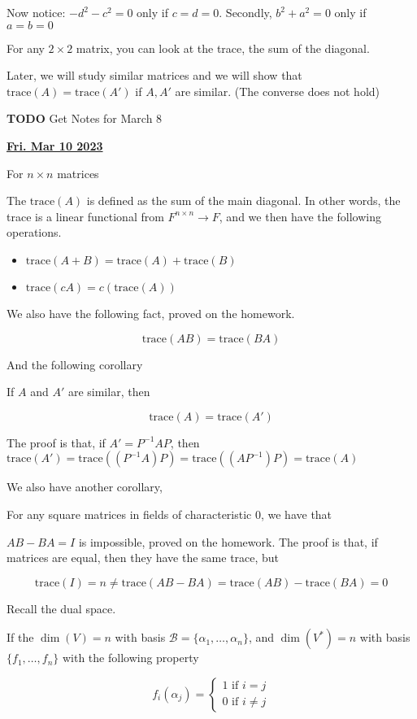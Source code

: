 \documentclass[12pt]{article}
\def\trace{\text{trace}}
\def\B{\mathcal B}
\renewcommand{\date}[1]{\underline{\bf #1}}
\newcommand{\TODO}{\color{red}\textbf{TODO}\color{black}}
\begin{document}
  Now notice: $-d^2 - c^2 = 0$ only if $c = d = 0$. Secondly, $b^2 + a^2 = 0$
  only if $a = b = 0$

  For any $2 \times 2$ matrix, you can look at the trace, the sum of the
  diagonal.

  Later, we will study similar matrices and we will show that $\text{trace}(A) =
  \text{trace}(A')$ if $A, A'$ are similar. (The converse does not hold)

  \TODO{} Get Notes for March 8

  \date{Fri. Mar 10 2023}

  For $n \times n$ matrices

  The $\trace(A)$ is defined as the sum of the main diagonal. In other words,
  the trace is a linear functional from $F^{n \times n} \to F$, and we then have
  the following operations.

  \begin{itemize}
    \item $\trace(A + B) = \trace(A) + \trace(B)$
    \item $\trace(cA) = c(\trace(A))$
  \end{itemize}

  We also have the following fact, proved on the homework.

  \[
    \trace(AB) = \trace(BA)
  \]

  And the following corollary

  If $A$ and $A'$ are similar, then

  \[
    \trace(A) = \trace(A')
  \]

  The proof is that, if $A' = P^{-1} A P$, then $\trace(A') = \trace((P^{-1} A) P)
  = \trace((A P^{-1}) P) = \trace(A)$

  We also have another corollary,

  For any square matrices in fields of characteristic $0$, we have that

  $AB - BA = I$ is impossible, proved on the homework. The proof is that, if
  matrices are equal, then they have the same trace, but

  \[
    \trace(I) = n \ne \trace(AB - BA) = \trace(AB) - \trace(BA) = 0
  \]

  Recall the dual space.

  If the $\dim(V) = n$ with basis $\B = \{\alpha_1, \dots, \alpha_n\}$, and
  $\dim(V^*) = n$ with basis $\{f_1, \dots, f_n \}$ with the following property

  \[
    f_i(\alpha_j) = \begin{cases}
      1 \text{ if $i = j$} \\
      0 \text{ if $i \ne j$}
    \end{cases}
  \]
\end{document}
